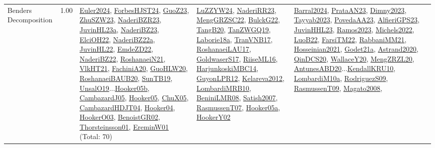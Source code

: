 {\begin{longtable}{p{3cm}r>{\raggedright\arraybackslash}p{6cm}>{\raggedright\arraybackslash}p{6cm}>{\raggedright\arraybackslash}p{8cm}}
\index{Benders Decomposition}\index{Concepts!Benders Decomposition}Benders Decomposition &  1.00 & \hyperref[detail:Euler2024]{Euler2024}, \hyperref[detail:ForbesHJST24]{ForbesHJST24}, \hyperref[detail:GuoZ23]{GuoZ23}, \hyperref[detail:ZhuSZW23]{ZhuSZW23}, \hyperref[detail:NaderiBZR23]{NaderiBZR23}, \hyperref[detail:JuvinHL23a]{JuvinHL23a}, \hyperref[detail:NaderiBZ23]{NaderiBZ23}, \hyperref[detail:ElciOH22]{ElciOH22}, \hyperref[detail:NaderiBZ22a]{NaderiBZ22a}, \hyperref[detail:JuvinHL22]{JuvinHL22}, \hyperref[detail:EmdeZD22]{EmdeZD22}, \hyperref[detail:NaderiBZ22]{NaderiBZ22}, \hyperref[detail:RoshanaeiN21]{RoshanaeiN21}, \hyperref[detail:VlkHT21]{VlkHT21}, \hyperref[detail:FachiniA20]{FachiniA20}, \hyperref[detail:GuoHLW20]{GuoHLW20}, \hyperref[detail:RoshanaeiBAUB20]{RoshanaeiBAUB20}, \hyperref[detail:SunTB19]{SunTB19}, \hyperref[detail:UnsalO19]{UnsalO19}...\hyperref[detail:Hooker05b]{Hooker05b}, \hyperref[detail:CambazardJ05]{CambazardJ05}, \hyperref[detail:Hooker05]{Hooker05}, \hyperref[detail:ChuX05]{ChuX05}, \hyperref[detail:CambazardHDJT04]{CambazardHDJT04}, \hyperref[detail:Hooker04]{Hooker04}, \hyperref[detail:HookerO03]{HookerO03}, \hyperref[detail:BenoistGR02]{BenoistGR02}, \hyperref[detail:Thorsteinsson01]{Thorsteinsson01}, \hyperref[detail:EreminW01]{EreminW01} (Total: 70) & \hyperref[detail:LuZZYW24]{LuZZYW24}, \hyperref[detail:NaderiRR23]{NaderiRR23}, \hyperref[detail:MengGRZSC22]{MengGRZSC22}, \hyperref[detail:BulckG22]{BulckG22}, \hyperref[detail:TangB20]{TangB20}, \hyperref[detail:TanZWGQ19]{TanZWGQ19}, \hyperref[detail:Laborie18a]{Laborie18a}, \hyperref[detail:TranVNB17]{TranVNB17}, \hyperref[detail:RoshanaeiLAU17]{RoshanaeiLAU17}, \hyperref[detail:GoldwaserS17]{GoldwaserS17}, \hyperref[detail:RiiseML16]{RiiseML16}, \hyperref[detail:HarjunkoskiMBC14]{HarjunkoskiMBC14}, \hyperref[detail:GuyonLPR12]{GuyonLPR12}, \hyperref[detail:Kelareva2012]{Kelareva2012}, \hyperref[detail:LombardiMRB10]{LombardiMRB10}, \hyperref[detail:BeniniLMR08]{BeniniLMR08}, \hyperref[detail:Satish2007]{Satish2007}, \hyperref[detail:RasmussenT07]{RasmussenT07}, \hyperref[detail:Hooker05a]{Hooker05a}, \hyperref[detail:HookerY02]{HookerY02} & \hyperref[detail:Barral2024]{Barral2024}, \hyperref[detail:PrataAN23]{PrataAN23}, \hyperref[detail:Dimny2023]{Dimny2023}, \hyperref[detail:Tayyab2023]{Tayyab2023}, \hyperref[detail:PovedaAA23]{PovedaAA23}, \hyperref[detail:AlfieriGPS23]{AlfieriGPS23}, \hyperref[detail:JuvinHHL23]{JuvinHHL23}, \hyperref[detail:Ramos2023]{Ramos2023}, \hyperref[detail:Michels2022]{Michels2022}, \hyperref[detail:LuoB22]{LuoB22}, \hyperref[detail:FarsiTM22]{FarsiTM22}, \hyperref[detail:RabbaniMM21]{RabbaniMM21}, \hyperref[detail:Hosseinian2021]{Hosseinian2021}, \hyperref[detail:Godet21a]{Godet21a}, \hyperref[detail:Astrand2020]{Astrand2020}, \hyperref[detail:QinDCS20]{QinDCS20}, \hyperref[detail:WallaceY20]{WallaceY20}, \hyperref[detail:MengZRZL20]{MengZRZL20}, \hyperref[detail:AntunesABD20]{AntunesABD20}...\hyperref[detail:KendallKRU10]{KendallKRU10}, \hyperref[detail:LombardiM10a]{LombardiM10a}, \hyperref[detail:RodriguezS09]{RodriguezS09}, \hyperref[detail:RasmussenT09]{RasmussenT09}, \hyperref[detail:Magato2008]{Magato2008}, 
\end{longtable}}

